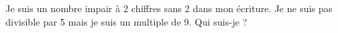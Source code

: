 \begin{exercice*}
   Je suis un nombre impair à 2 chiffres sans 2 dans mon écriture. Je ne suis pas divisible par 5 mais je suis un multiple de 9. Qui suis-je ?    
\end{exercice*}
